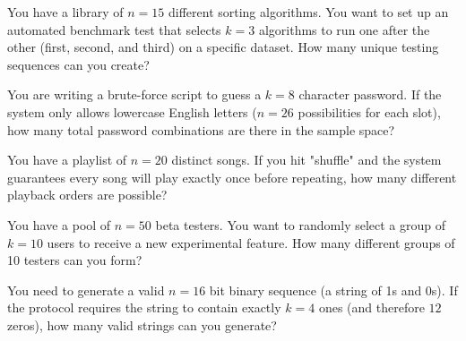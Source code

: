 \documentclass[12pt]{article}
\begin{document}
\begin{enumerate}



You have a library of $n=15$ different sorting algorithms. You want to set up an automated benchmark test that selects $k=3$ algorithms to run one after the other (first, second, and third) on a specific dataset. How many unique testing sequences can you create?


You are writing a brute-force script to guess a $k=8$ character password. If the system only allows lowercase English letters ($n=26$ possibilities for each slot), how many total password combinations are there in the sample space?


You have a playlist of $n=20$ distinct songs. If you hit "shuffle" and the system guarantees every song will play exactly once before repeating, how many different playback orders are possible?


You have a pool of $n=50$ beta testers. You want to randomly select a group of $k=10$ users to receive a new experimental feature. How many different groups of 10 testers can you form?


You need to generate a valid $n=16$ bit binary sequence (a string of 1s and 0s). If the protocol requires the string to contain exactly $k=4$ ones (and therefore $12$ zeros), how many valid strings can you generate?




\end{enumerate}
\end{document}

